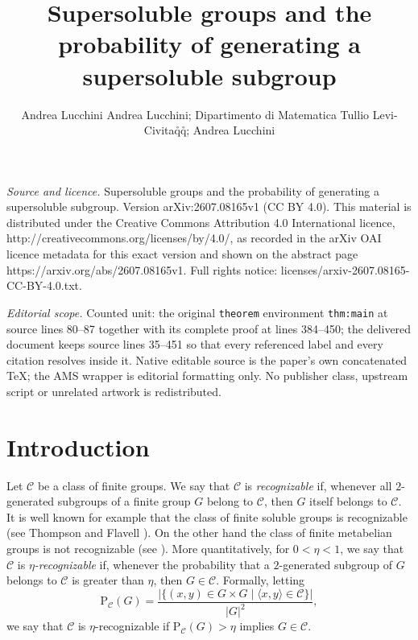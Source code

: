 \documentclass[10pt,a4paper]{amsart}
\begin{document}
\title[Supersoluble groups and the probability of generating a supe]{Supersoluble groups and the probability of generating a supersoluble subgroup}
\author{Andrea Lucchini Andrea Lucchini; Dipartimento di Matematica Tullio Levi-Civitaq̊q̊; Andrea Lucchini}
\date{}
\maketitle
\noindent\emph{Source and licence.} Supersoluble groups and the probability of generating a supersoluble subgroup. Version arXiv:2607.08165v1 (CC BY 4.0). This material is distributed under the Creative Commons Attribution 4.0 International licence, http://creativecommons.org/licenses/by/4.0/, as recorded in the arXiv OAI licence metadata for this exact version and shown on the abstract page https://arxiv.org/abs/2607.08165v1. Full rights notice: licenses/arxiv-2607.08165-CC-BY-4.0.txt.\par\smallskip
\noindent\textit{Editorial scope.} Counted unit: the original \texttt{theorem} environment \texttt{thm:main} at source lines 80--87 together with its complete proof at lines 384--450; the delivered document keeps source lines 35--451 so that every referenced label and every citation resolves inside it. Native editable source is the paper's own concatenated TeX; the AMS wrapper is editorial formatting only. No publisher class, upstream script or unrelated artwork is redistributed.
	\section{Introduction}
	
	Let $\mathcal{C}$ be a class of finite groups. We say that 
	$\mathcal{C}$ is \textit{recognizable} if, whenever all 
	$2$-generated subgroups of a finite group $G$ belong to 
	$\mathcal{C}$, then $G$ itself belongs to $\mathcal{C}$. 
	It is well known for example that the class of finite soluble groups is recognizable (see Thompson \cite{th} and Flavell \cite{pf}). On the other hand the class of finite metabelian groups is not recognizable (see \cite[Example 7.1]{bln}).
	More quantitatively, for $0 < \eta < 1$, we say that 
	$\mathcal{C}$ is \textit{$\eta$-recognizable} if, whenever 
	the probability that a $2$-generated subgroup of $G$ belongs 
	to $\mathcal{C}$ is greater than $\eta$, then $G \in \mathcal{C}$. 
	Formally, letting
	$$\mathrm{P}_{\mathcal{C}}(G) = \frac{|\{(x,y) \in G \times G 
		\mid \langle x,y\rangle \in \mathcal{C}\}|}{|G|^2},$$
	we say that $\mathcal{C}$ is $\eta$-recognizable if 
	$\mathrm{P}_{\mathcal{C}}(G) > \eta$ implies $G \in \mathcal{C}$.
	
\end{document}

